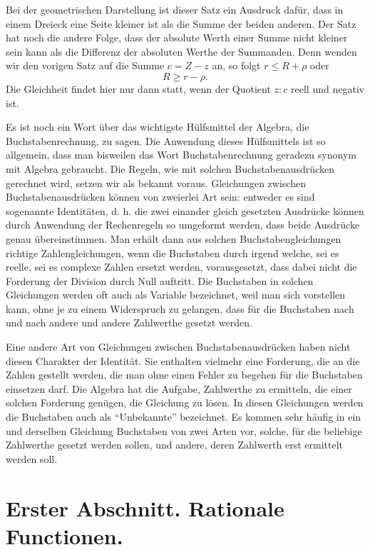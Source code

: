 \documentclass[11pt]{article}
\begin{document}
Bei der geometrischen Darstellung ist dieser Satz ein Ausdruck dafür, dass in einem Dreieck eine Seite kleiner ist als die Summe der beiden anderen. Der Satz hat noch die andere Folge, dass der absolute Werth einer Summe nicht kleiner sein kann als die Differenz der absoluten Werthe der Summanden. Denn wenden wir den vorigen Satz auf die Summe $c=Z-z$ an, so folgt $r\le R+\rho$ oder
\[
 R\ge r-\rho.
\]
Die Gleichheit findet hier nur dann statt, wenn der Quotient $z:c$ reell und negativ ist.

Es ist noch ein Wort über das wichtigste Hülfsmittel der Algebra, die Buchstabenrechnung, zu sagen. Die Anwendung dieses Hülfsmittels ist so allgemein, dass man bisweilen das Wort Buchstabenrechnung geradezu synonym mit Algebra gebraucht. Die Regeln, wie mit solchen Buchstabenausdrücken gerechnet wird, setzen wir als bekannt voraus. Gleichungen zwischen Buchstabenausdrücken können von zweierlei Art sein: entweder es sind sogenannte Identitäten, d. h. die zwei einander gleich gesetzten Ausdrücke können durch Anwendung der Rechenregeln so umgeformt werden, dass beide Ausdrücke genau übereinstimmen. Man erhält dann aus solchen Buchstabengleichungen richtige Zahlengleichungen, wenn die Buchstaben durch irgend welche, sei es reelle, sei es complexe Zahlen ersetzt werden, vorausgesetzt, dass dabei nicht die Forderung der Division durch Null auftritt. Die Buchstaben in solchen Gleichungen werden oft auch als Variable bezeichnet, weil man sich vorstellen kann, ohne je zu einem Widerspruch zu gelangen, dass für die Buchstaben nach und nach andere und andere Zahlwerthe gesetzt werden.

Eine andere Art von Gleichungen zwischen Buchstabenausdrücken haben nicht diesen Charakter der Identität. Sie enthalten vielmehr eine Forderung, die an die Zahlen gestellt werden, die man ohne einen Fehler zu begehen für die Buchstaben einsetzen darf. Die Algebra hat die Aufgabe, Zahlwerthe zu ermitteln, die einer solchen Forderung genügen, die Gleichung zu lösen. In diesen Gleichungen werden die Buchstaben auch als ``Unbekannte'' bezeichnet. Es kommen sehr häufig in ein und derselben Gleichung Buchstaben von zwei Arten vor, solche, für die beliebige Zahlwerthe gesetzt werden sollen, und andere, deren Zahlwerth erst ermittelt werden soll.

\clearpage
\clearpage

\section*{Erster Abschnitt. Rationale Functionen.}
\end{document}
